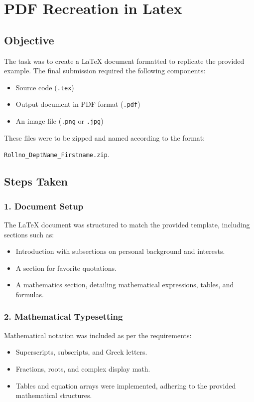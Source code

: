 

\section{PDF Recreation in Latex}

\subsection{Objective}
The task was to create a LaTeX document formatted to replicate the provided example. The final submission required the following components:
\begin{itemize}
    \item Source code (\texttt{.tex})
    \item Output document in PDF format (\texttt{.pdf})
    \item An image file (\texttt{.png} or \texttt{.jpg})
\end{itemize}
These files were to be zipped and named according to the format: 

\texttt{Rollno\_DeptName\_Firstname.zip}.

\subsection{Steps Taken}

\subsubsection{1. Document Setup}
The LaTeX document was structured to match the provided template, including sections such as:
\begin{itemize}
    \item Introduction with subsections on personal background and interests.
    \item A section for favorite quotations.
    \item A mathematics section, detailing mathematical expressions, tables, and formulas.
\end{itemize}

\subsubsection{2. Mathematical Typesetting}
Mathematical notation was included as per the requirements:
\begin{itemize}
    \item Superscripts, subscripts, and Greek letters.
    \item Fractions, roots, and complex display math.
    \item Tables and equation arrays were implemented, adhering to the provided mathematical structures.
\end{itemize}

